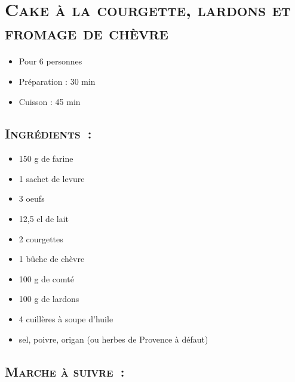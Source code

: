 \section[\normalsize{Cake \`a la courgette, lardons et fromage de ch\`evre}]{\LARGE{\textsc{Cake \`a la courgette, lardons et fromage de ch\`evre}}}		%


\begin{itemize}
\item Pour 6 personnes
\item Préparation : 30 min
\item Cuisson : 45 min
\end{itemize}

\subsection*{\textsc{Ingr\'edients~:}}

\begin{itemize}
\item 150 g de farine
\item 1 sachet de levure
\item 3 oeufs
\item 12,5 cl de lait
\item 2 courgettes
\item 1 bûche de ch\`evre
\item 100 g de comt\'e
\item 100 g de lardons
\item 4 cuill\`eres \`a soupe d'huile
\item sel, poivre, origan (ou herbes de Provence \`a d\'efaut)
\end{itemize}


\subsection*{\textsc{Marche \`a suivre~:}}

